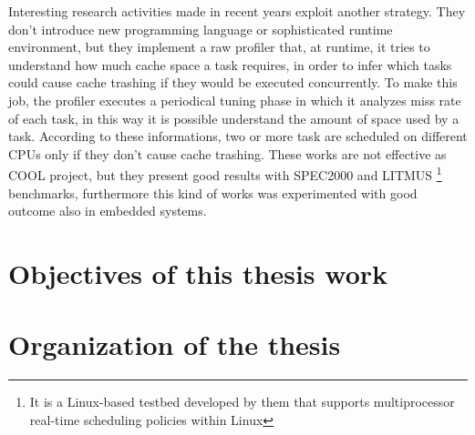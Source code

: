 Interesting research activities made in recent years exploit another strategy. They don't introduce new programming language or sophisticated runtime 
environment, but they implement a raw profiler that, at runtime, it tries to understand how much cache space a task requires, in order to infer which 
tasks could cause cache trashing if they would be executed concurrently.
To make this job, the profiler executes a periodical tuning phase in which it analyzes miss rate of each task, in this way it is possible understand the 
amount of space used by a task. According to these informations, two or more
task are scheduled on different CPUs only if 
they don't cause cache trashing. These works are not effective as COOL project, but they present good results with SPEC2000 and 
LITMUS \footnote{It is a Linux-based testbed developed by them that supports multiprocessor real-time scheduling policies within Linux} benchmarks, 
furthermore this kind of works was experimented with good outcome also in embedded systems.


\section{Objectives of this thesis work}
\label{sec:ObjectiveOfThesis}


\section{Organization of the thesis}
\label{sec:OrganizationThesis}

